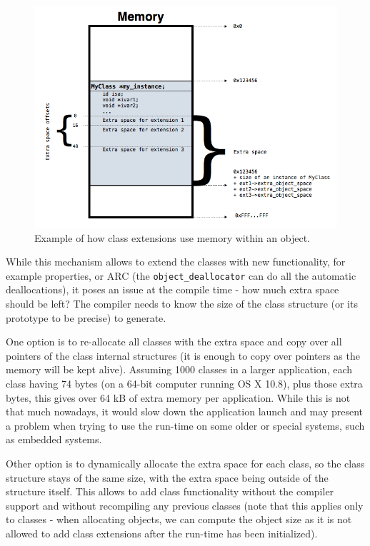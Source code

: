 \begin{figure}[H] 
  
  \includegraphics[width=\textwidth]{img/class_extensions.png}
  
  \centering{}
  \caption{Example of how class extensions use memory within an object.}
  \label{fig:class_ext_mem_usage_img}
\end{figure}

While this mechanism allows to extend the classes with new functionality, for example properties, or ARC (the \verb=object_deallocator= can do all the automatic deallocations), it poses an issue at the compile time - how much extra space should be left? The compiler needs to know the size of the class structure (or its prototype to be precise) to generate.

One option is to re-allocate all classes with the extra space and copy over all pointers of the class internal structures (it is enough to copy over pointers as the memory will be kept alive). Assuming 1000 classes in a larger application, each class having 74 bytes (on a 64-bit computer running OS X 10.8), plus those extra bytes, this gives over 64 kB of extra memory per application. While this is not that much nowadays, it would slow down the application launch and may present a problem when trying to use the run-time on some older or special systems, such as embedded systems.

Other option is to dynamically allocate the extra space for each class, so the class structure stays of the same size, with the extra space being outside of the structure itself. This allows to add class functionality without the compiler support and without recompiling any previous classes (note that this applies only to classes - when allocating objects, we can compute the object size as it is not allowed to add class extensions after the run-time has been initialized).

